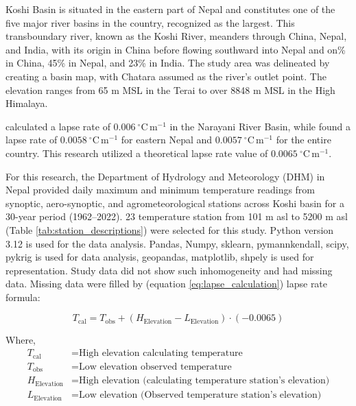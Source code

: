 
Koshi Basin is situated in the eastern part of Nepal and constitutes one of the five major river basins in the country, recognized as the largest. This transboundary river, known as the Koshi River, meanders through China, Nepal, and India, with its origin in China before flowing southward into Nepal and on\% in China, 45\% in Nepal, and 23\% in India. The study area was delineated by creating a basin map, with Chatara assumed as the river's outlet point. The elevation ranges from 65 m MSL in the Terai to over 8848 m MSL in the High Himalaya.


\citet{chand_trend_2019} calculated a lapse rate of \(0.006 \ ^\circ \mathrm{C} \, \mathrm{m}^{-1}\) in the Narayani River Basin, while \citet{nayava_spatial_2017} found a lapse rate of \(0.0058 \ ^\circ \mathrm{C} \, \mathrm{m}^{-1}\) for eastern Nepal and \(0.0057 \ ^\circ \mathrm{C} \, \mathrm{m}^{-1}\) for the entire country. This research utilized a theoretical lapse rate value of \(0.0065 \ ^\circ \mathrm{C} \, \mathrm{m}^{-1}\).


For this research, the Department of Hydrology and Meteorology (DHM) in Nepal provided daily maximum and minimum temperature readings from synoptic, aero-synoptic, and agrometeorological stations across Koshi basin for a 30-year period (1962--2022). 23 temperature station from 101 m asl to 5200 m asl (Table \ref{tab:station_descriptions}) were selected for this study. Python version 3.12 is used for the data analysis. Pandas, Numpy, sklearn, pymannkendall, scipy, pykrig is used for data analysis, geopandas, matplotlib, shpely is used for representation. Study data did not show such inhomogeneity and had missing data. Missing data were filled by (equation \ref{eq:lapse_calculation}) lapse rate formula:

\begin{equation}
  T_{\text{cal}} = T_{\text{obs}} + (H_{\text{Elevation}} - L_{\text{Elevation}}) \cdot (-0.0065)
  \label{eq:lapse_calculation}
  \end{equation}
  
  Where, 
  \begin{align*}
  T_{\text{cal}} & = \text{High elevation calculating temperature} \\
  T_{\text{obs}} & = \text{Low elevation observed temperature} \\
  H_{\text{Elevation}} & = \text{High elevation (calculating temperature station's elevation)}  \\
  L_{\text{Elevation}} & = \text{Low elevation (Observed temperature station's elevation)}   
  \end{align*}

